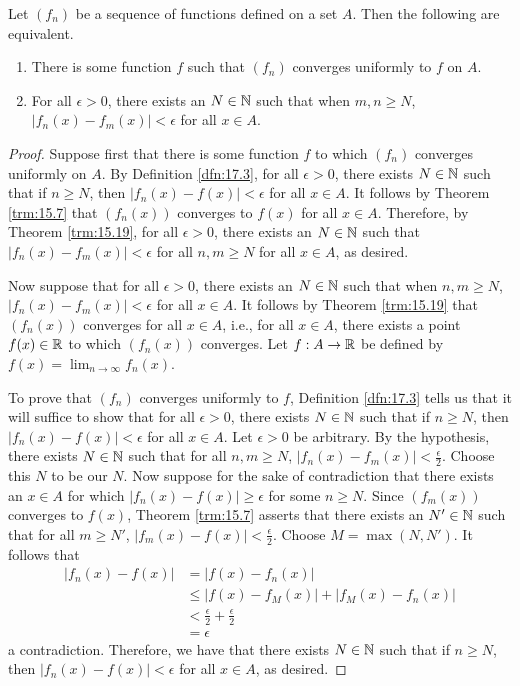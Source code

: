 \documentclass[../main.tex]{subfiles}
\begin{document}
\begin{theorem}\label{trm:17.9}
    Let $(f_n)$ be a sequence of functions defined on a set $A$. Then the following are equivalent.
    \begin{enumerate}[label={\textup{(}\alph*\textup{)}}]
        \item There is some function $f$ such that $(f_n)$ converges uniformly to $f$ on $A$.
        \item For all $\epsilon>0$, there exists an $N\in\mathbb{N}$ such that when $m,n\geq N$, $|f_n(x)-f_m(x)|<\epsilon$ for all $x\in A$.
    \end{enumerate}
    \begin{proof}
        Suppose first that there is some function $f$ to which $(f_n)$ converges uniformly on $A$. By Definition \ref{dfn:17.3}, for all $\epsilon>0$, there exists $N\in\mathbb{N}$ such that if $n\geq N$, then $|f_n(x)-f(x)|<\epsilon$ for all $x\in A$. It follows by Theorem \ref{trm:15.7} that $(f_n(x))$ converges to $f(x)$ for all $x\in A$. Therefore, by Theorem \ref{trm:15.19}, for all $\epsilon>0$, there exists an $N\in\mathbb{N}$ such that $|f_n(x)-f_m(x)|<\epsilon$ for all $n,m\geq N$ for all $x\in A$, as desired.\par\smallskip
        Now suppose that for all $\epsilon>0$, there exists an $N\in\mathbb{N}$ such that when $n,m\geq N$, $|f_n(x)-f_m(x)|<\epsilon$ for all $x\in A$. It follows by Theorem \ref{trm:15.19} that $(f_n(x))$ converges for all $x\in A$, i.e., for all $x\in A$, there exists a point $f(x)\in\mathbb{R}$ to which $(f_n(x))$ converges. Let $f:A\to\mathbb{R}$ be defined by $f(x)=\lim_{n\to\infty}f_n(x)$.\par
        To prove that $(f_n)$ converges uniformly to $f$, Definition \ref{dfn:17.3} tells us that it will suffice to show that for all $\epsilon>0$, there exists $N\in\mathbb{N}$ such that if $n\geq N$, then $|f_n(x)-f(x)|<\epsilon$ for all $x\in A$. Let $\epsilon>0$ be arbitrary. By the hypothesis, there exists $N\in\mathbb{N}$ such that for all $n,m\geq N$, $|f_n(x)-f_m(x)|<\frac{\epsilon}{2}$. Choose this $N$ to be our $N$. Now suppose for the sake of contradiction that there exists an $x\in A$ for which $|f_n(x)-f(x)|\geq\epsilon$ for some $n\geq N$. Since $(f_m(x))$ converges to $f(x)$, Theorem \ref{trm:15.7} asserts that there exists an $N'\in\mathbb{N}$ such that for all $m\geq N'$, $|f_m(x)-f(x)|<\frac{\epsilon}{2}$. Choose $M=\max(N,N')$. It follows that
        \begin{align*}
            |f_n(x)-f(x)| &= |f(x)-f_n(x)|\\
            &\leq |f(x)-f_M(x)|+|f_M(x)-f_n(x)|\\
            &< \frac{\epsilon}{2}+\frac{\epsilon}{2}\\
            &= \epsilon
        \end{align*}
        a contradiction. Therefore, we have that there exists $N\in\mathbb{N}$ such that if $n\geq N$, then $|f_n(x)-f(x)|<\epsilon$ for all $x\in A$, as desired.
    \end{proof}
\end{theorem}
\end{document}
